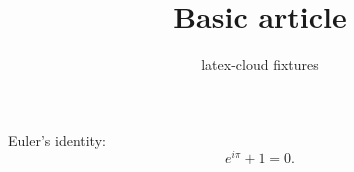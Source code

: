 \documentclass{article}
\title{Basic article}
\author{latex-cloud fixtures}
\begin{document}
\maketitle
Euler's identity:
\begin{equation}
  e^{i\pi} + 1 = 0.
\end{equation}
\end{document}
